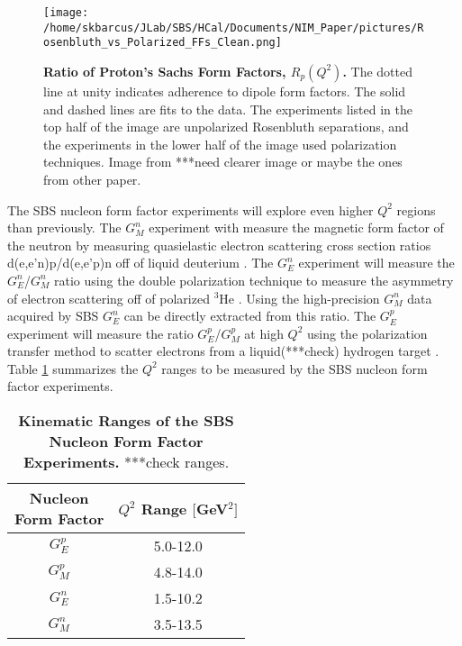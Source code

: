 \documentclass[review]{elsarticle}
\newcommand{\q}{$Q^2$ }
\begin{document}
	\begin{figure}[!ht]
	\begin{center}
	\texttt{[image: /home/skbarcus/JLab/SBS/HCal/Documents/NIM\_Paper/pictures/Rosenbluth\_vs\_Polarized\_FFs\_Clean.png]}
	\end{center}
	\caption{
	{\bf{Ratio of Proton's Sachs Form Factors, $R_p(Q^2)$.}} The dotted line at unity indicates adherence to dipole form factors. The solid and dashed lines are fits to the data. The experiments listed in the top half of the image are unpolarized Rosenbluth separations, and the experiments in the lower half of the image used polarization techniques. Image from \cite{cisbani_2014}***need clearer image or maybe the ones from other paper.}
	\label{fig:polarization_vs_rosenbluth}
	\end{figure}	

The SBS nucleon form factor experiments will explore even higher \q regions than previously. The $G_M^n$ experiment with measure the magnetic form factor of the neutron by measuring quasielastic electron scattering cross section ratios d(e,e'n)p/d(e,e'p)n off of liquid deuterium \cite{gmn_proposal}. The $G_E^n$ experiment will measure the $G_E^n$/$G_M^n$ ratio using the double polarization technique to measure the asymmetry of electron scattering off of polarized $^3$He \cite{gen_proposal}. Using the high-precision $G_M^n$ data acquired by SBS $G_E^n$ can be directly extracted from this ratio. The $G_E^p$ experiment will measure the ratio $G_E^p$/$G_M^p$ at high $Q^2$ using the polarization transfer method to scatter electrons from a liquid(***check) hydrogen target \cite{gep_proposal}. Table \ref{tab:q2_ranges} summarizes the \q ranges to be measured by the SBS nucleon form factor experiments.\\ 

 	\begin{table}[h]
	\centering
	\begin{tabular}{|cc|}
	\hline
	\makecell{Nucleon\\ Form Factor} & \makecell{\q Range\\ $[$GeV$^2]$}\\
	\hline
	$G_E^p$ & 5.0-12.0\\
    $G_M^p$ & 4.8-14.0\\
    $G_E^n$ & 1.5-10.2\\
    $G_M^n$ & 3.5-13.5\\
	\hline
	\end{tabular}
	\caption{{\bf{Kinematic Ranges of the SBS Nucleon Form Factor Experiments.}} ***check ranges.} %
	\label{tab:q2_ranges}
	\end{table}
	
\end{document}
